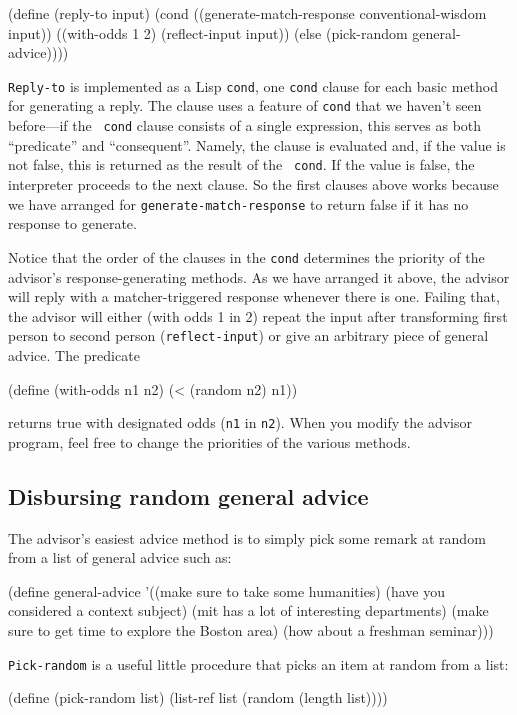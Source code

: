 \beginlisp
(define (reply-to input)
  (cond ((generate-match-response conventional-wisdom input))
        ((with-odds 1 2) (reflect-input input))
        (else (pick-random general-advice))))
\endlisp

{\tt Reply-to} is implemented as a Lisp {\tt cond}, one {\tt cond}
clause for each basic method for generating a reply.  The clause uses
a feature of {\tt cond} that we haven't seen before---if the {\tt
cond} clause consists of a single expression, this serves as both
``predicate'' and ``consequent''.  Namely, the clause is evaluated and, if
the value is not false, this is returned as the result of the {\tt
cond}.  If the value is false, the interpreter proceeds to the next
clause.  So the first clauses above works because we have
arranged for {\tt generate-match-response} to return false if it has no
response to generate.

Notice that the order of the clauses in the {\tt cond} determines the
priority of the advisor's response-generating methods.  As we have
arranged it above, the advisor will reply with a matcher-triggered
response whenever there is one.  Failing that, the advisor will either
(with odds 1 in 2) repeat the input after transforming first person to
second person ({\tt reflect-input}) or give an arbitrary piece of
general advice.  The predicate

\beginlisp
(define (with-odds n1 n2) (< (random n2) n1))
\endlisp

\noindent
returns true with designated odds ({\tt n1} in {\tt n2}).
When you modify the advisor program, feel free to change the priorities
of the various methods.

\subsection{Disbursing random general advice}

The advisor's easiest advice method is to simply pick some remark at
random from a list of general advice such as:

\beginlisp
(define general-advice
  '((make sure to take some humanities)
    (have you considered a context subject)
    (mit has a lot of interesting departments)
    (make sure to get time to explore the Boston area)
    (how about a freshman seminar)))
\endlisp

\noindent
{\tt Pick-random} is a useful little procedure that picks an item at
random from a list:

\beginlisp
(define (pick-random list) (list-ref list (random (length list))))
\endlisp

